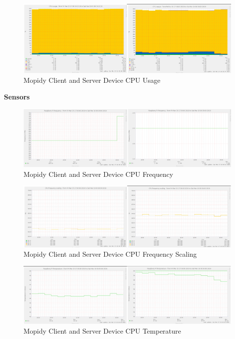 \documentclass[11pt,a4paper,headinclude=false,footinclude=false]{scrreprt}
\begin{document}
\begin{figure}[H]
\includegraphics{ResultsAndAnalysis/MopidyServerTestImages/004MopidyCPUUsage.png}
\centering
\caption{Mopidy Client and Server Device CPU Usage}
\label{MopidyCPUUsage}
\end{figure}

\textbf{Sensors}

\begin{figure}[H]
\includegraphics{ResultsAndAnalysis/MopidyServerTestImages/001MopidyCPUFreq.png}
\centering
\caption{Mopidy Client and Server Device CPU Frequency}
\label{MopidyCPUFreq}
\end{figure}

\begin{figure}[H]
\includegraphics{ResultsAndAnalysis/MopidyServerTestImages/002MopidyCPUFreqScaling.png}
\centering
\caption{Mopidy Client and Server Device CPU Frequency Scaling}
\label{MopidyCPUFreqScaling}
\end{figure}

\begin{figure}[H]
\includegraphics{ResultsAndAnalysis/MopidyServerTestImages/003MopidyCPUTemp.png}
\centering
\caption{Mopidy Client and Server Device CPU Temperature}
\label{MopidyCPUTemp}
\end{figure}
\end{document}
